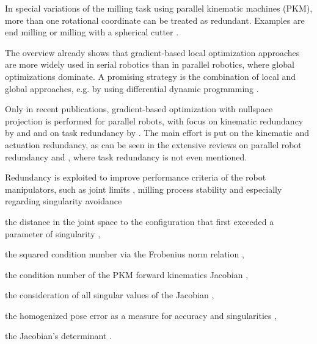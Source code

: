 \documentclass[a4paper,twoside]{article}
\begin{document}
In special variations of the milling task using parallel kinematic machines (PKM), more than one rotational coordinate can be treated as redundant.
Examples are end milling \cite{ShawChe2001} or milling with a spherical cutter \cite{SmirnovPlyMir2013}. %

The overview already shows that gradient-based local optimization approaches are more widely used in serial robotics than in parallel robotics, where global optimizations dominate.
A promising strategy is the combination of local and global approaches, e.g. by using differential dynamic programming \cite{SantosSil2017}.


Only in recent publications, gradient-based optimization with nullspace projection is performed for parallel robots, with focus on kinematic redundancy by \cite{GosselinSch2016} and \cite{SantosSil2017} and on task redundancy by \cite{AgarwalNasBan2016}.
The main effort is put on the kinematic and actuation redundancy, as can be seen in the extensive reviews on parallel robot redundancy \cite{LucesMilBen2017} and \cite{GosselinSch2018}, where task redundancy is not even mentioned.

Redundancy is exploited to improve performance criteria of the robot manipulators, such as joint limits \cite{HuoBar2008,ZhuQuCaoYan2013}, milling process stability \cite{MousaviGagBouRay2018} and especially regarding singularity avoidance
\begin{compactitem}
\item the distance in the joint space to the configuration that first exceeded a parameter of singularity \cite{HuoBar2008},
\item the squared condition number \cite{ZhuQuCaoYan2013,LegerAng2016,CorinaldiAngCal2016} via the Frobenius norm relation \cite{Merlet2006a},
\item the condition number of the PKM forward kinematics Jacobian \cite{GosselinSch2016},
\item the consideration of all singular values of the Jacobian \cite{SantosSil2017},
\item the homogenized pose error as a measure for accuracy and singularities \cite{KotlarskiDoHeiOrt2010},
\item the Jacobian's determinant \cite{AgarwalNasBan2016}.
\end{compactitem}
\end{document}

